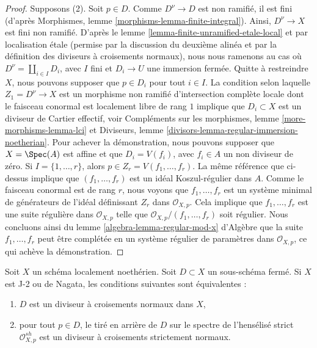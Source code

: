 \begin{proof}
\medskip\noindent
Supposons (2). Soit $p \in D$. Comme $D^\nu \to D$ est non ramifié, il est
fini (d'après Morphismes, lemme \ref{morphisms-lemma-finite-integral}).
Ainsi, $D^\nu \to X$ est fini non ramifié.
D'après le lemme \ref{lemma-finite-unramified-etale-local}
et par localisation \'etale (permise par la discussion
du deuxième alinéa et par la définition des diviseurs à
croisements normaux), nous nous ramenons au cas où
$D^\nu = \coprod_{i \in I} D_i$,
avec $I$ fini et $D_i \to U$ une immersion fermée.
Quitte à restreindre $X$, nous pouvons supposer
que $p \in D_i$ pour tout $i \in I$. La condition selon laquelle $Z_1 =  D^\nu \to X$ est un
morphisme non ramifié d'intersection complète locale
dont le faisceau conormal est localement libre de rang $1$
implique que $D_i \subset X$ est un diviseur de Cartier effectif, voir
Compléments sur les morphismes, lemme \ref{more-morphisms-lemma-lci} et
Diviseurs, lemme \ref{divisors-lemma-regular-immersion-noetherian}.
Pour achever la démonstration, nous pouvons supposer que $X = \Spec(A)$ est affine
et que $D_i = V(f_i)$, avec $f_i \in A$ un non diviseur de zéro.
Si $I = \{1, \ldots, r\}$, alors $p \in Z_r = V(f_1, \ldots, f_r)$.
La même référence que ci-dessus implique que
$(f_1, \ldots, f_r)$ est un idéal Koszul-régulier dans $A$.
Comme le faisceau conormal est de rang $r$, nous voyons que
$f_1, \ldots, f_r$ est un système minimal de générateurs de
l'idéal définissant $Z_r$ dans $\mathcal{O}_{X, p}$.
Cela implique que $f_1, \ldots, f_r$ est une suite régulière
dans $\mathcal{O}_{X, p}$ telle que $\mathcal{O}_{X, p}/(f_1, \ldots, f_r)$
soit régulier. Nous concluons ainsi du
lemme \ref{algebra-lemma-regular-mod-x} d'Algèbre
que la suite $f_1, \ldots, f_r$ peut être complétée en un système régulier de paramètres
dans $\mathcal{O}_{X, p}$, ce qui achève la démonstration.
\end{proof}

\begin{lemma}
\label{lemma-characterize-normal-crossings}
Soit $X$ un schéma localement noethérien. Soit $D \subset X$ un sous-schéma
fermé. Si $X$ est J-2 ou de Nagata, les conditions suivantes sont équivalentes :
\begin{enumerate}
\item $D$ est un diviseur à croisements normaux dans $X$,
\item pour tout $p \in D$, le tiré en arrière de $D$ sur le spectre de
l'hensélisé strict $\mathcal{O}_{X, p}^{sh}$
est un diviseur à croisements strictement normaux.
\end{enumerate}
\end{lemma}

